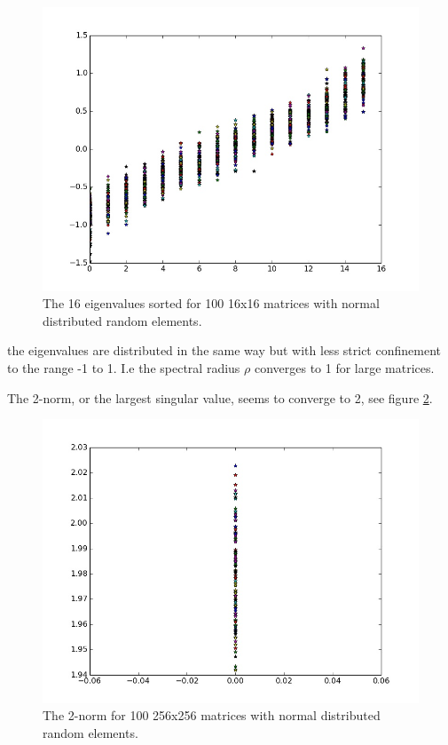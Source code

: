 \documentclass[a4paper]{article}
\begin{document}
\begin{enumerate}
\begin{figure}
\centering
\includegraphics[scale=0.3]{task1_a_2.jpeg}
\caption{\label{fig: t1a2}The 16 eigenvalues sorted for 100 16x16 matrices with normal distributed random elements.}
\end{figure} 
the eigenvalues are distributed in the same way but with less strict confinement to the range -1 to 1. I.e the spectral radius $\rho$ converges to 1 for large matrices.

The 2-norm, or the largest singular value, seems to converge to 2, see figure \ref{fig: t1b1}.

\begin{figure}
\centering
\includegraphics[scale=0.3]{task1_b_1.jpeg}
\caption{\label{fig: t1b1}The 2-norm for 100 256x256 matrices with normal distributed random elements.}
\end{figure} 


\end{enumerate}
\end{document}
